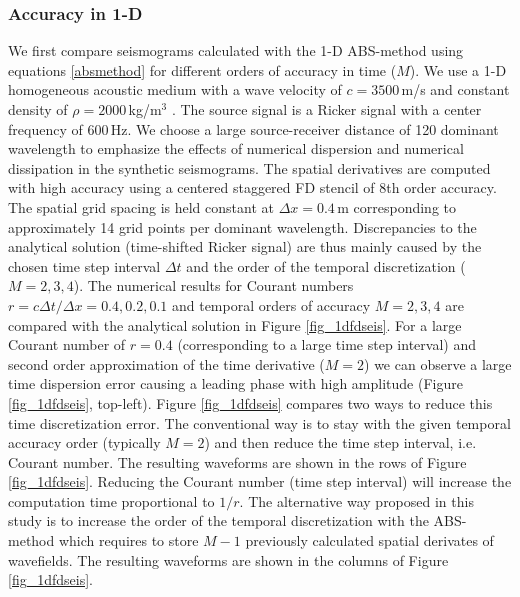\documentclass[11pt,onecolumn,oneside]{article}
\begin{document}
\subsubsection{Accuracy in 1-D}
We first compare seismograms calculated with the 1-D ABS-method using equations \ref{absmethod} for different orders of accuracy in time ($M$). We use a 1-D homogeneous acoustic 
medium with a wave velocity of $c=3500$\,m/s and constant density of $\rho=2000$\,kg/m$^3$ . The source signal is a Ricker signal with a center frequency of 600\,Hz. We choose a large source-receiver distance of 120 dominant wavelength to emphasize the effects of numerical dispersion and numerical dissipation in the synthetic seismograms. The spatial derivatives are
computed with high accuracy using a centered staggered FD stencil of 8th order accuracy.  The spatial grid spacing is held constant at $\Delta x=0.4$\,m corresponding to approximately 14 grid points per dominant wavelength. Discrepancies to the analytical solution (time-shifted Ricker signal) are thus mainly caused by the chosen time step interval $\Delta t$ and the order of the temporal discretization ($M=2,3,4$). The numerical results for Courant numbers $r=c \Delta t/\Delta x=0.4, 0.2, 0.1$ and temporal orders of accuracy $M=2, 3, 4$ are compared with the analytical solution in Figure \ref{fig_1dfdseis}.  For a large Courant number of $r=0.4$ (corresponding to a large time step interval) and second order approximation of the time derivative ($M=2$) we can observe a large time dispersion error causing a leading phase with high amplitude (Figure \ref{fig_1dfdseis}, top-left). Figure  \ref{fig_1dfdseis} compares two ways to reduce this time discretization error. The conventional way is to  stay with the given temporal accuracy order (typically $M=2$) and then reduce the time step interval, i.e. Courant number. The resulting waveforms are shown in the rows of Figure  \ref{fig_1dfdseis}.
Reducing the Courant number (time step interval) will increase the computation time proportional to $1/r$.  The alternative  way proposed in this study is to increase the order of the temporal discretization with the ABS-method which requires to store $M-1$ previously calculated spatial derivates of wavefields. The resulting waveforms are shown in the columns of  Figure  \ref{fig_1dfdseis}. \\ \\
%
\end{document}
